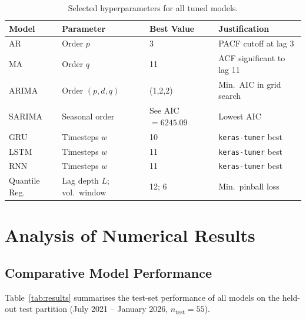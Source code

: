 \documentclass[12pt,a4paper]{article}
\begin{document}
\begin{table}[H]
\centering
\caption{Selected hyperparameters for all tuned models.}
\label{tab:hyperparams}
\begin{tabular}{@{}llll@{}}
\toprule
\textbf{Model} & \textbf{Parameter} & \textbf{Best Value} & \textbf{Justification} \\
\midrule
AR            & Order $p$                   & 3        & PACF cutoff at lag 3 \\
MA            & Order $q$                   & 11       & ACF significant to lag 11 \\
ARIMA         & Order $(p,d,q)$             & (1,2,2)  & Min.\ AIC in grid search \\
SARIMA        & Seasonal order              & See AIC $= 6245.09$ & Lowest AIC \\
GRU           & Timesteps $w$               & 10       & \texttt{keras-tuner} best \\
LSTM          & Timesteps $w$               & 11       & \texttt{keras-tuner} best \\
RNN           & Timesteps $w$               & 11       & \texttt{keras-tuner} best \\
Quantile Reg. & Lag depth $L$; vol.\ window & 12; 6    & Min.\ pinball loss \\
\bottomrule
\end{tabular}
\end{table}

\section{Analysis of Numerical Results}

\subsection{Comparative Model Performance}

Table~\ref{tab:results} summarises the test-set performance of all models on the held-out test partition (July 2021 -- January 2026, $n_{\text{test}} = 55$).
\end{document}
